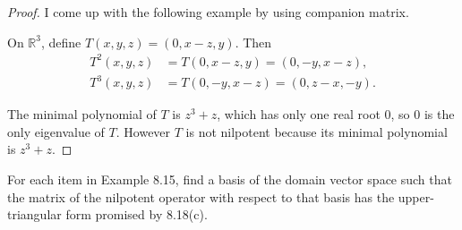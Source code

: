 \begin{proof}
    I come up with the following example by using companion matrix.

    On $\mathbb{R}^{3}$, define $T(x, y, z) = (0, x - z, y)$. Then
    \begin{align*}
        T^{2}(x, y, z) & = T(0, x-z, y) = (0, -y, x-z),  \\
        T^{3}(x, y, z) & = T(0, -y, x-z) = (0, z-x, -y).
    \end{align*}

    The minimal polynomial of $T$ is $z^{3} + z$, which has only one real root $0$, so $0$ is the only eigenvalue of $T$. However $T$ is not nilpotent because its minimal polynomial is $z^{3} + z$.
\end{proof}
\newpage

\begin{exercise}\label{chapter8:sectionA:exercise24}
    For each item in Example 8.15, find a basis of the domain vector space such that the matrix of the nilpotent operator with respect to that basis has the upper-triangular form promised by 8.18(c).
\end{exercise}

